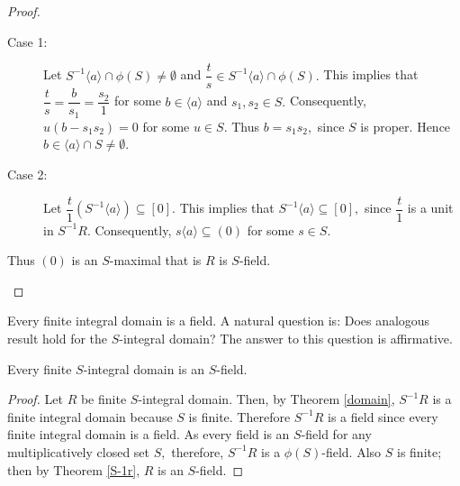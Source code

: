 \documentclass[11pt]{article}
\begin{document}
\begin{proof}
\begin{enumerate}
			\begin{description}
				\item[Case 1:] Let $S^{-1}\langle a\rangle \cap \phi(S)\neq \emptyset$ and $\dfrac{t}{s}\in S^{-1}\langle a\rangle \cap \phi(S).$ This implies that $\dfrac{t}{s}=\dfrac{b}{s_1}=\dfrac{s_2}{1}$ for some $b\in\langle a\rangle $ and $s_1,s_2\in S.$ Consequently, $u(b-s_1s_2)=0$ for some $u\in S$. Thus $b=s_1s_2,$ since $S$ is proper. Hence $b\in \langle a\rangle \cap S\neq \emptyset.$
				\item[Case 2:] Let $\dfrac{t}{1}(S^{-1}\langle a\rangle)\subseteq [0]$. This implies that $S^{-1}\langle a\rangle \subseteq [0],$ since $\dfrac{t}{1}$ is a unit in $S^{-1}R$. Consequently, $s\langle a\rangle\subseteq (0)$ for some $s\in S$.
			\end{description}
			Thus $(0)$ is an $S$-maximal that is $R$ is $S$-field.
		\end{enumerate}
	\end{proof}
	Every finite integral domain is a field. A natural question is: Does analogous result hold for the $S$-integral domain? The answer to this question is affirmative.
	
	\begin{cor}\label{cor}
		Every finite $S$-integral domain is an $S$-field.
	\end{cor}
	\begin{proof}
		Let $R$ be finite $S$-integral domain. Then, by Theorem \ref{domain}, $S^{-1}R$ is a finite integral domain because $S$ is finite. Therefore $S^{-1}R$ is a field since every finite integral domain is a field. As every field is an $S$-field for any multiplicatively closed set $S,$ therefore, $S^{-1}R$ is a $\phi(S)$-field. Also $S$ is finite; then by Theorem \ref{S-1r}, $R$ is an $S$-field.
	\end{proof}
\end{document}
